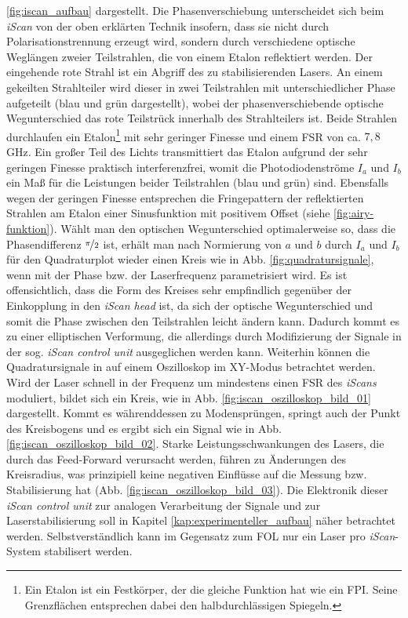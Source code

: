 \ref{fig:iscan_aufbau} dargestellt. Die Phasenverschiebung
unterscheidet sich beim \textit{iScan} von der oben erklärten Technik insofern,
dass sie nicht durch Polarisationstrennung erzeugt wird, sondern durch
verschiedene optische Weglängen zweier Teilstrahlen, die von einem Etalon
reflektiert werden. Der eingehende rote Strahl ist ein Abgriff des zu
stabilisierenden Lasers. An einem gekeilten Strahlteiler wird dieser in zwei
Teilstrahlen mit unterschiedlicher Phase aufgeteilt (blau und grün dargestellt),
wobei der phasenverschiebende optische Wegunterschied das rote Teilstrück
innerhalb des Strahlteilers ist. Beide Strahlen durchlaufen ein Etalon\footnote{Ein Etalon
ist ein Festkörper, der die gleiche Funktion hat wie ein FPI. Seine Grenzflächen
entsprechen dabei den halbdurchlässigen Spiegeln.} mit sehr geringer Finesse und
einem FSR von ca. $7,8\,$GHz. Ein großer Teil des Lichts transmittiert das
Etalon aufgrund der sehr geringen Finesse praktisch interferenzfrei, womit die
Photodiodenströme $I_a$ und $I_b$ ein Maß für die Leistungen beider Teilstrahlen
(blau und grün) sind. Ebensfalls wegen der geringen Finesse entsprechen die
Fringepattern der reflektierten Strahlen am Etalon einer Sinusfunktion mit
positivem Offset (siehe \ref{fig:airy-funktion}). Wählt man den optischen
Wegunterschied optimalerweise so, dass die Phasendifferenz $\nicefrac{\pi}{2}$
ist, erhält man nach Normierung von $a$ und $b$ durch $I_a$ und $I_b$ für den Quadraturplot
wieder einen Kreis wie in Abb. \ref{fig:quadratursignale}, wenn mit der Phase
bzw. der Laserfrequenz parametrisiert wird. Es ist offensichtlich, dass die Form
des Kreises sehr empfindlich gegenüber der Einkopplung in den \textit{iScan
head} ist, da sich der optische Wegunterschied und somit die Phase zwischen den
Teilstrahlen leicht ändern kann. Dadurch kommt es zu einer elliptischen
Verformung, die allerdings durch Modifizierung der Signale in der sog.
\textit{iScan control unit} \cite{iscan_hardware_guide} ausgeglichen werden
kann. Weiterhin können die Quadratursignale in auf einem Oszilloskop im XY-Modus
betrachtet werden. Wird der Laser schnell in der Frequenz um mindestens einen
FSR des \textit{iScans} moduliert, bildet sich ein Kreis, wie in Abb.
\ref{fig:iscan_oszilloskop_bild_01} dargestellt. Kommt es währenddessen zu
Modensprüngen, springt auch der Punkt des Kreisbogens und es ergibt sich ein
Signal wie in Abb. \ref{fig:iscan_oszilloskop_bild_02}. Starke
Leistungsschwankungen des Lasers, die durch das Feed-Forward verursacht werden,
führen zu Änderungen des Kreisradius, was prinzipiell keine negativen Einflüsse
auf die Messung bzw. Stabilisierung hat
(Abb. \ref{fig:iscan_oszilloskop_bild_03}).
Die Elektronik dieser \textit{iScan control unit} zur analogen Verarbeitung der Signale und zur Laserstabilisierung soll in Kapitel \ref{kap:experimenteller_aufbau} näher betrachtet werden.
Selbstverständlich kann im Gegensatz zum FOL nur ein Laser pro
\textit{iScan}-System stabilisert werden.


